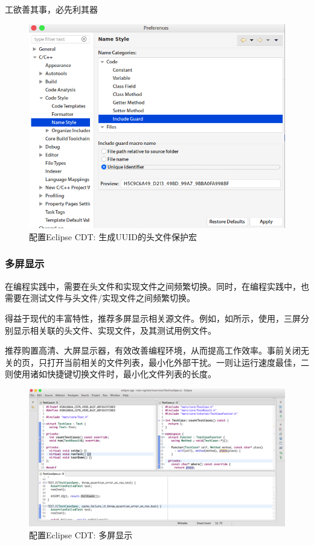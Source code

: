 \begin{content}
\begin{episode}{工欲善其事，必先利其器}
\begin{content}
\begin{figure}[H]
\centering
\includegraphics[width=1.0\textwidth]{figures/xunit/eclipse-include-guard.png}
\caption{配置Eclipse CDT: 生成UUID的头文件保护宏}
 \label{fig:eclipse-include-guard}
\end{figure}

\subsubsection{多屏显示}

在\cpp{}编程实践中，需要在头文件和实现文件之间频繁切换。同时，在编程实践中，也需要在测试文件与头文件/实现文件之间频繁切换。

得益于现代的丰富特性，推荐多屏显示相关源文件。例如，如所示，使用，三屏分别显示相关联的头文件、实现文件，及其测试用例文件。

推荐购置高清、大屏显示器，有效改善编程环境，从而提高工作效率。事前关闭无关的页，只打开当前相关的文件列表，最小化外部干扰。一则让运行速度最佳，二则使用诸如快捷键切换文件时，最小化文件列表的长度。

\begin{figure}[H]
\centering
\includegraphics[width=1.0\textwidth]{figures/xunit/eclipse-multi-editor.png}
\caption{配置Eclipse CDT: 多屏显示}
 \label{fig:eclipse-multi-editor}
\end{figure}


\end{content}
\end{episode}
\end{content}
